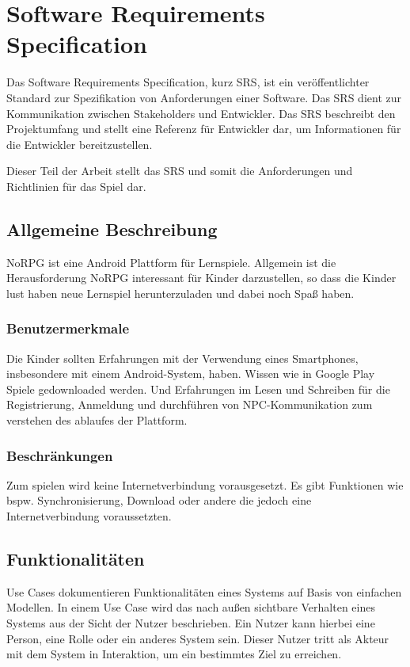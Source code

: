 \chapter{Software Requirements Specification}
	Das Software Requirements Specification, kurz SRS, ist ein veröffentlichter Standard zur Spezifikation von Anforderungen einer Software. Das SRS dient zur Kommunikation zwischen Stakeholders und Entwickler. Das SRS beschreibt den Projektumfang und stellt eine Referenz für Entwickler dar, um Informationen für die Entwickler bereitzustellen.
	
	Dieser Teil der Arbeit stellt das SRS und somit die Anforderungen und Richtlinien für das Spiel dar.
	
\section{Allgemeine Beschreibung}
	NoRPG ist eine Android Plattform für Lernspiele. Allgemein ist die Herausforderung NoRPG interessant für Kinder darzustellen, so dass die Kinder lust haben neue Lernspiel herunterzuladen und dabei noch Spaß haben.
	
	\subsection{Benutzermerkmale}
		Die Kinder sollten Erfahrungen mit der Verwendung eines Smartphones, insbesondere mit einem Android-System, haben. Wissen wie in Google Play Spiele gedownloaded werden. Und Erfahrungen im Lesen und Schreiben für die Registrierung, Anmeldung und durchführen von NPC-Kommunikation zum verstehen des ablaufes der Plattform.
	
	\subsection{Beschränkungen} 
		Zum spielen wird keine Internetverbindung vorausgesetzt. Es gibt Funktionen wie bspw. Synchronisierung, Download oder andere die jedoch eine Internetverbindung voraussetzten.  

\section{Funktionalitäten}
	Use Cases dokumentieren Funktionalitäten eines Systems auf Basis von einfachen Modellen. In einem Use Case wird das nach außen sichtbare Verhalten eines Systems aus der Sicht der Nutzer beschrieben. Ein Nutzer kann hierbei eine Person, eine Rolle oder ein anderes System sein. Dieser Nutzer tritt als Akteur mit dem System in Interaktion, um ein bestimmtes Ziel zu erreichen.
	
